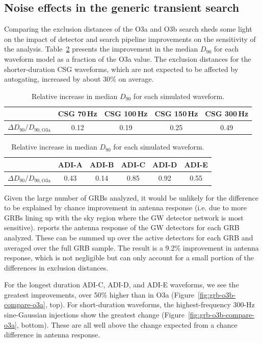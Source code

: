 \subsection{Noise effects in the generic transient search}\label{sec:grb-o3b-noise}

Comparing the exclusion distances of the O3a and O3b search sheds some light on the impact of detector and search pipeline improvements on the sensitivity of the \xpip analysis.
Table~\ref{tab:grb-o3b-compare-o3a} presents the improvement in the median $D_{90}$ for each waveform model as a fraction of the O3a value.
The exclusion distances for the shorter-duration CSG waveforms, which are not expected to be affected by autogating, increased by about 30\% on average.

\begin{table}[h]
  \hspace{0.5cm}
  \caption
  {\label{tab:grb-o3b-compare-o3a} Relative increase in median $D_{90}$ for each \xpip simulated waveform.}
  \begin{tabular}{c c c c c}
    \hline
    \hline
    \rule{0pt}{4ex}
    & CSG 70\,Hz & CSG 100\,Hz & CSG 150\,Hz & CSG 300\,Hz \\
    \hline
    \rule[-2ex]{0pt}{4ex}
		$\Delta D_{90} / D_{90, \text{O3a}}$ & 0.12 & 0.19 & 0.25 & 0.49
  \end{tabular}
  \begin{tabular}{c c c c c c}
    \hline
    \hline
    \rule{0pt}{4ex}
    & ADI-A & ADI-B & ADI-C & ADI-D & ADI-E \\
    \hline
    \rule[-2ex]{0pt}{4ex}
    $\Delta D_{90} / D_{90, \text{O3a}}$ & 0.43 & 0.14 & 0.85 & 0.92 & 0.55 \\
    \hline
  \end{tabular}
\end{table}

Given the large number of GRBs analyzed, it would be unlikely for the difference to be explained by chance improvement in antenna response (i.e. due to more GRBs lining up with the sky region where the GW detector network is most sensitive).
\xpip reports the antenna response of the GW detectors for each GRB analyzed.
These can be summed up over the active detectors for each GRB and averaged over the full GRB sample.
The result is a 9.2\% improvement in antenna response, which is not negligible but can only account for a small portion of the differences in exclusion distances.

For the longest duration ADI-C, ADI-D, and ADI-E waveforms, we see the greatest improvements, over 50\% higher than in O3a (Figure~\ref{fig:grb-o3b-compare-o3a}, top).
For short-duration waveforms, the highest-frequency 300-Hz sine-Gaussian injections show the greatest change (Figure~\ref{fig:grb-o3b-compare-o3a}, bottom).
These are all well above the change expected from a chance difference in antenna response.

